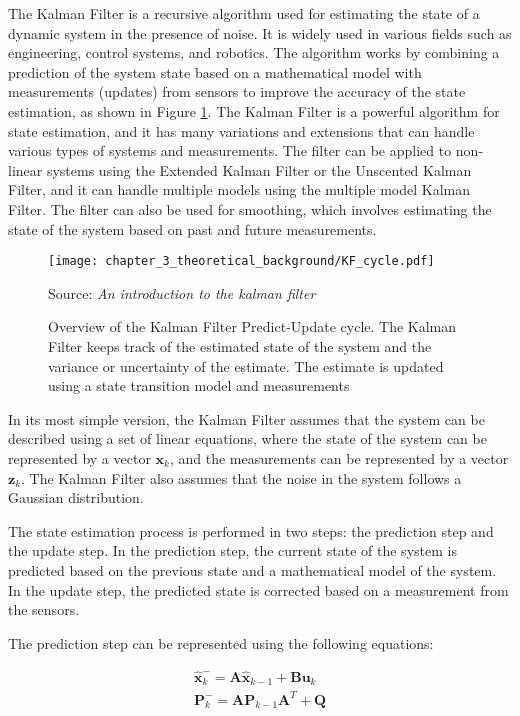 The Kalman Filter \cite{kalman1960new} is a recursive algorithm used for estimating the state of a dynamic system in the presence of noise. It is widely used in various fields such as engineering, control systems, and robotics. The algorithm works by combining a prediction of the system state based on a mathematical model with measurements (updates) from sensors to improve the accuracy of the state estimation, as shown in Figure \ref{fig:chapter_3_theoretical_background/KF_cycle}. The Kalman Filter is a powerful algorithm for state estimation, and it has many variations and extensions that can handle various types of systems and measurements. The filter can be applied to non-linear systems using the Extended Kalman Filter or the Unscented Kalman Filter, and it can handle multiple models using the multiple model Kalman Filter. The filter can also be used for smoothing, which involves estimating the state of the system based on past and future measurements.

\begin{figure}[h]
	\centering
	\texttt{[image: chapter\_3\_theoretical\_background/KF\_cycle.pdf]}
	\caption[Overview of the Kalman Filter Predict-Update cycle]{Overview of the Kalman Filter Predict-Update cycle. The Kalman Filter keeps track of the estimated state of the system and the variance or uncertainty of the estimate. The estimate is updated using a state transition model and measurements}
	Source: \textit{An introduction to the kalman filter} \cite{bishop2001introduction}
	\label{fig:chapter_3_theoretical_background/KF_cycle}
\end{figure}

In its most simple version, the Kalman Filter assumes that the system can be described using a set of linear equations, where the state of the system can be represented by a vector $\mathbf{x}_k$, and the measurements can be represented by a vector $\mathbf{z}_k$. The Kalman Filter also assumes that the noise in the system follows a Gaussian distribution.

The state estimation process is performed in two steps: the prediction step and the update step. In the prediction step, the current state of the system is predicted based on the previous state and a mathematical model of the system. In the update step, the predicted state is corrected based on a measurement from the sensors.

The prediction step can be represented using the following equations:

\begin{equation}
\begin{split}
	\hat{\mathbf{x}}_k^- = \mathbf{A} \hat{\mathbf{x}}_{k-1} + \mathbf{B} \mathbf{u}_k \\
	\mathbf{P}_k^- = \mathbf{A} \mathbf{P}_{k-1} \mathbf{A}^T + \mathbf{Q}
\end{split}
\end{equation}

